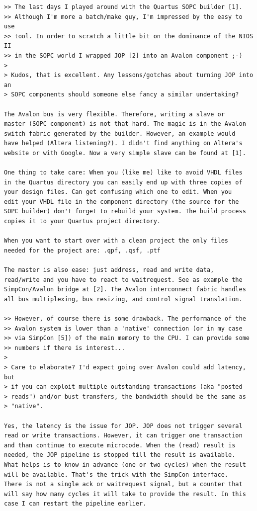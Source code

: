 \documentclass[a4paper,12pt]{scrartcl}
\begin{document}
\begin{verbatim}
>> The last days I played around with the Quartus SOPC builder [1].
>> Although I'm more a batch/make guy, I'm impressed by the easy to use
>> tool. In order to scratch a little bit on the dominance of the NIOS II
>> in the SOPC world I wrapped JOP [2] into an Avalon component ;-)
>
> Kudos, that is excellent. Any lessons/gotchas about turning JOP into an
> SOPC components should someone else fancy a similar undertaking?

The Avalon bus is very flexible. Therefore, writing a slave or
master (SOPC component) is not that hard. The magic is in the Avalon
switch fabric generated by the builder. However, an example would
have helped (Altera listening?). I didn't find anything on Altera's
website or with Google. Now a very simple slave can be found at [1].

One thing to take care: When you (like me) like to avoid VHDL files
in the Quartus directory you can easily end up with three copies of
your design files. Can get confusing which one to edit. When you
edit your VHDL file in the component directory (the source for the
SOPC builder) don't forget to rebuild your system. The build process
copies it to your Quartus project directory.

When you want to start over with a clean project the only files
needed for the project are: .qpf, .qsf, .ptf

The master is also ease: just address, read and write data,
read/write and you have to react to waitrequest. See as example the
SimpCon/Avalon bridge at [2]. The Avalon interconnect fabric handles
all bus multiplexing, bus resizing, and control signal translation.

>> However, of course there is some drawback. The performance of the
>> Avalon system is lower than a 'native' connection (or in my case
>> via SimpCon [5]) of the main memory to the CPU. I can provide some
>> numbers if there is interest...
>
> Care to elaborate? I'd expect going over Avalon could add latency, but
> if you can exploit multiple outstanding transactions (aka "posted
> reads") and/or bust transfers, the bandwidth should be the same as
> "native".

Yes, the latency is the issue for JOP. JOP does not trigger several
read or write transactions. However, it can trigger one transaction
and than continue to execute microcode. When the (read) result is
needed, the JOP pipeline is stopped till the result is available.
What helps is to know in advance (one or two cycles) when the result
will be available. That's the trick with the SimpCon interface.
There is not a single ack or waitrequest signal, but a counter that
will say how many cycles it will take to provide the result. In this
case I can restart the pipeline earlier.


\end{verbatim}
\end{document}
